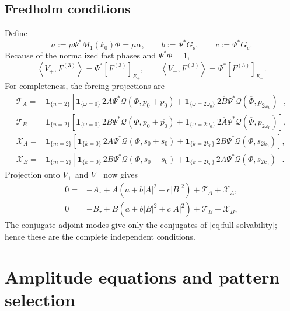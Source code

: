 \documentclass[11pt]{article}
\newcommand{\cQ}{\mathcal{Q}}
\newcommand{\ip}[2]{\left\langle #1,#2\right\rangle}
\newcommand{\one}[1]{\bm{1}_{\{#1\}}}
\begin{document}
\subsection{Fredholm conditions}

Define
\begin{equation}
 a:=\mu\Psi^*M_1(k_0)\Phi=\mu\alpha,
 \qquad b:=\Psi^*G_{\mathrm{s}},
 \qquad c:=\Psi^*G_{\mathrm{c}}.
 \label{eq:abc}
\end{equation}
Because of the normalized fast phases and $\Psi^*\Phi=1$,
\begin{equation}
 \ip{V_+}{F^{(3)}}=\Psi^*[F^{(3)}]_{E_+},
 \qquad
 \ip{V_-}{F^{(3)}}=\Psi^*[F^{(3)}]_{E_-}.
 \label{eq:projection-extracts-coefficient}
\end{equation}
For completeness, the forcing projections are
\begin{subequations}
\label{eq:forcing-projections}
\begin{align}
 \mathcal T_A={}&\one{n=2}\left[
 \one{\omega=0}\,2A\Psi^*\cQ(\Phi,p_0+\overline{p_0})
 +\one{\omega=2\omega_0}\,2\overline B
 \Psi^*\cQ(\overline\Phi,p_{2\omega_0})\right],\\
 \mathcal T_B={}&\one{n=2}\left[
 \one{\omega=0}\,2B\Psi^*\cQ(\Phi,p_0+\overline{p_0})
 +\one{\omega=2\omega_0}\,2\overline A
 \Psi^*\cQ(\overline\Phi,p_{2\omega_0})\right],\\
 \mathcal X_A={}&\one{m=2}\left[
 \one{k=0}\,2A\Psi^*\cQ(\Phi,s_0+\overline{s_0})
 +\one{k=2k_0}\,2B\Psi^*\cQ(\Phi,s_{2k_0})\right],\\
 \mathcal X_B={}&\one{m=2}\left[
 \one{k=0}\,2B\Psi^*\cQ(\Phi,s_0+\overline{s_0})
 +\one{k=2k_0}\,2A\Psi^*\cQ(\Phi,\overline{s_{2k_0}})\right].
\end{align}
\end{subequations}
Projection onto $V_+$ and $V_-$ now gives
\begin{subequations}
\label{eq:full-solvability}
\begin{align}
 0={}&-A_\tau+A(a+b|A|^2+c|B|^2)+\mathcal T_A+\mathcal X_A,
 \label{eq:solvability-A}\\
 0={}&-B_\tau+B(a+b|B|^2+c|A|^2)+\mathcal T_B+\mathcal X_B,
 \label{eq:solvability-B}
\end{align}
\end{subequations}
The conjugate adjoint modes give only the conjugates of
\eqref{eq:full-solvability}; hence these are the complete independent
conditions.

\section{Amplitude equations and pattern selection}
\end{document}
